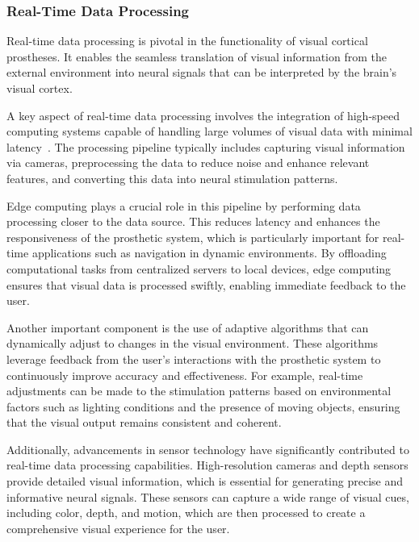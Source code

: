 \documentclass[twocolumn,10pt]{article}
\begin{document}
\subsubsection*{Real-Time Data Processing}
Real-time data processing is pivotal in the functionality of visual cortical
prostheses. It enables the seamless translation of visual information from the
external environment into neural signals that can be interpreted by the brain's
visual cortex.

A key aspect of real-time data processing involves the integration of high-speed
computing systems capable of handling large volumes of visual data with minimal
latency~\cite{nurmikkoChallengesLargeScaleCortical2020}. The processing pipeline typically includes capturing visual information
via cameras, preprocessing the data to reduce noise and enhance relevant
features, and converting this data into neural stimulation patterns.


Edge computing plays a crucial role in this pipeline by performing data
processing closer to the data source. This reduces latency and enhances the
responsiveness of the prosthetic system, which is particularly important for
real-time applications such as navigation in dynamic environments. By offloading
computational tasks from centralized servers to local devices, edge computing
ensures that visual data is processed swiftly, enabling immediate feedback to
the user.

Another important component is the use of adaptive algorithms that can
dynamically adjust to changes in the visual environment. These algorithms
leverage feedback from the user's interactions with the prosthetic system to
continuously improve accuracy and effectiveness. For example, real-time
adjustments can be made to the stimulation patterns based on environmental
factors such as lighting conditions and the presence of moving objects, ensuring
that the visual output remains consistent and coherent.

Additionally, advancements in sensor technology have significantly contributed
to real-time data processing capabilities. High-resolution cameras and depth
sensors provide detailed visual information, which is essential for generating
precise and informative neural signals. These sensors can capture a wide range
of visual cues, including color, depth, and motion, which are then processed to
create a comprehensive visual experience for the user.
\end{document}
